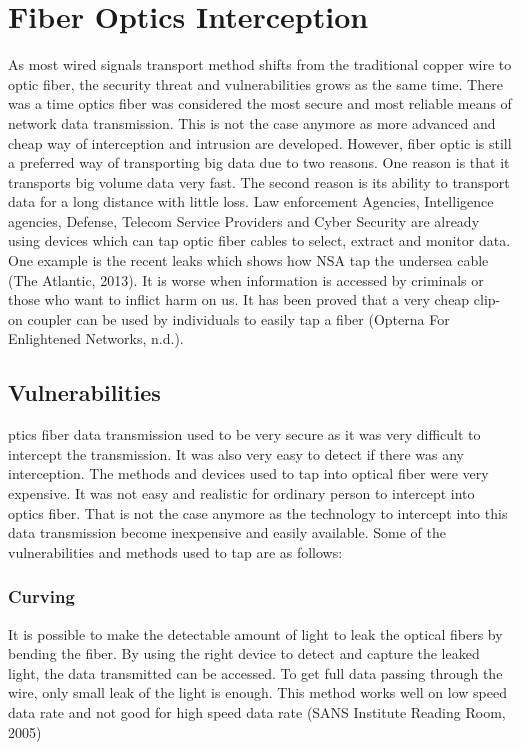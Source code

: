 \documentclass{article}
\begin{document}
\section{Fiber Optics Interception}
As most wired signals transport method shifts from the traditional copper wire to optic fiber, the security threat and vulnerabilities grows as the same time. There was a time optics fiber was considered the most secure and most reliable means of network data transmission. This is not the case anymore as more advanced and cheap way of interception and intrusion are developed. However, fiber optic is still a preferred way of transporting big data due to two reasons. One reason is that it transports big volume data very fast. The second reason is its ability to transport data for a long distance with little loss. Law enforcement Agencies, Intelligence agencies, Defense, Telecom Service Providers and Cyber Security are already using devices which can tap optic fiber cables to select, extract and monitor data. One example is the recent leaks which shows how NSA tap the undersea cable (The Atlantic, 2013). It is worse when information is accessed by criminals or those who want to inflict harm on us. It has been proved that a very cheap clip-on coupler can be used by individuals to easily tap a fiber (Opterna For Enlightened Networks, n.d.).

\subsection{Vulnerabilities}
ptics fiber data transmission used to be very secure as it was very difficult to intercept the transmission. It was also very easy to detect if there was any interception. The methods and devices used to tap into optical fiber were very expensive. It was not easy and realistic for ordinary person to intercept into optics fiber. That is not the case anymore as the technology to intercept into this data transmission become inexpensive and easily available. Some of the vulnerabilities and methods used to tap are as follows:

\subsubsection{Curving}
It is possible to make the detectable amount of light to leak the optical fibers by bending the fiber. By using the right device to detect and capture the leaked light, the data transmitted can be accessed. To get full data passing through the wire, only small leak of the light is enough. This method works well on low speed data rate and not good for high speed data rate (SANS Institute Reading Room, 2005)
\end{document}
